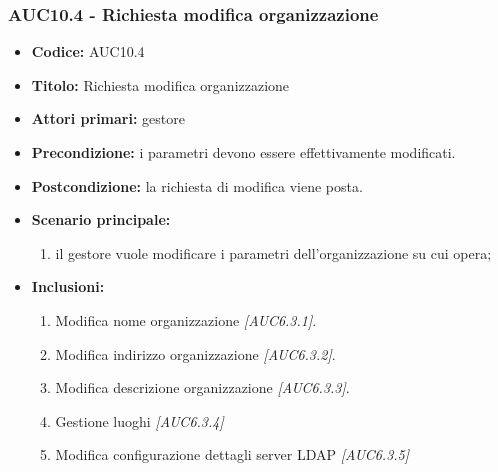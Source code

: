 \documentclass[casi-duso]{subfiles}
\begin{document}
\subsubsection{AUC10.4 - Richiesta modifica organizzazione}%
\label{subsub:AUC10.4}
\begin{itemize}
  \item \textbf{Codice:} AUC10.4
  \item \textbf{Titolo:} Richiesta modifica organizzazione
  \item \textbf{Attori primari:} gestore
  \item \textbf{Precondizione:} i parametri devono essere effettivamente modificati.
  \item \textbf{Postcondizione:} la richiesta di modifica viene posta.
  \item \textbf{Scenario principale:}
  \begin{enumerate}
    \item il gestore vuole modificare i parametri dell'organizzazione su cui opera;
  \end{enumerate}
  \item \textbf{Inclusioni:}
  \begin{enumerate}
    \item Modifica nome organizzazione \emph{[AUC6.3.1]}.
    \item Modifica indirizzo organizzazione \emph{[AUC6.3.2]}.
    \item Modifica descrizione organizzazione \emph{[AUC6.3.3]}.
    \item Gestione luoghi \emph{[AUC6.3.4]} 
    \item Modifica configurazione dettagli server LDAP \emph{[AUC6.3.5]} 
  \end{enumerate}
\end{itemize}
\end{document}
